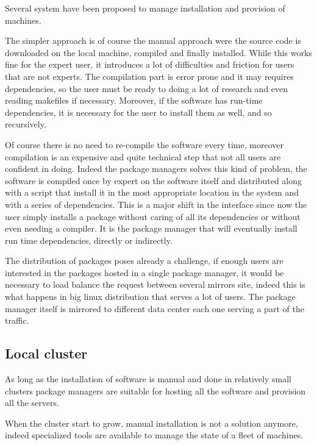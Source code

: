 Several system have been proposed to manage installation and provision of machines.

The simpler approach is of course the manual approach were the source code is
downloaded on the local machine, compiled and finally installed. While this
works fine for the expert user, it introduces a lot of difficulties and
friction for users that are not experts. The compilation part is error prone
and it may requires dependencies, so the user must be ready to doing a lot of
research and even reading makefiles if necessary. Moreover, if the software has
run-time dependencies, it is necessary for the user to install them as well,
and so recursively.

Of course there is no need to re-compile the software every time, moreover
compilation is an expensive and quite technical step that not all users are
confident in doing.  Indeed the package managers solves this kind of problem,
the software is compiled once by expert on the software itself and distributed
along with a script that install it in the most appropriate location in the
system and with a series of dependencies. This is a major shift in the
interface since now the user simply installs a package without caring of all
its dependencies or without even needing a compiler. It is the package manager
that will eventually install run time dependencies, directly or indirectly.

The distribution of packages poses already a challenge, if enough users are
interested in the packages hosted in a single package manager, it would be
necessary to load balance the request between several mirrors site, indeed this
is what happens in big linux distribution that serves a lot of users. The
package manager itself is mirrored to different data center each one serving a
part of the traffic.

\subsection{Local cluster} \label{subsec:soacluster}

As long as the installation of software is manual and done in relatively small
clusters package managers are suitable for hosting all the software and
provision all the servers.

When the cluster start to grow, manual installation is not a solution anymore,
indeed specialized tools are available to manage the state of a fleet of
machines.

